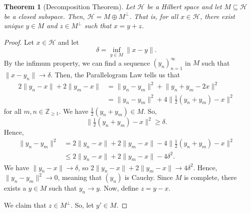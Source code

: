 \documentclass[a4paper, openany]{memoir}
\theoremstyle{definition}
\theoremstyle{plain}
\newtheorem{theorem}[definition]{Theorem}
\begin{document}
    \begin{theorem}[Decomposition Theorem]
        Let $\mathcal{H}$ be a Hilbert space and let $M \subseteq \mathcal{H}$ be a closed subspace. Then, $\mathcal{H} = M \oplus M^\perp$. That is, for all $x \in \mathcal{H}$, there exist unique $y \in M$ and $z \in M^\perp$ such that $x = y + z$.
    \end{theorem}
    \begin{proof}
        Let $x \in \mathcal{H}$ and let
        \[\delta = \inf_{y \in M} \lVert x - y \rVert.\]
        By the infimum property, we can find a sequence $(y_n)_{n=1}^\infty$ in $M$ such that $\lVert x - y_n \rVert \to \delta$. Then, the Parallelogram Law tells us that 
        \begin{align*}
            2\lVert y_n - x \rVert + 2\lVert y_m - x \rVert &= \lVert y_n - y_m \rVert^2 + \lVert y_n + y_m - 2x \rVert^2 \\
            &= \lVert y_n - y_m \rVert^2 + 4 \lVert \tfrac{1}{2} (y_n + y_m) - x \rVert^2
        \end{align*}
        for all $m, n \in \mathbb{Z}_{\geq 1}$. We have $\frac{1}{2}(y_n + y_m) \in M$. So,
        \[\lVert \tfrac{1}{2} (y_n + y_m) - x \rVert^2 \geq \delta.\]
        Hence,
        \begin{align*}
            \lVert y_n - y_m \rVert^2 &= 2\lVert y_n - x \rVert + 2\lVert y_m - x \rVert -  4\lVert \tfrac{1}{2} (y_n + y_m) - x \rVert^2 \\
            &\leq 2\lVert y_n - x \rVert + 2\lVert y_m - x \rVert - 4\delta^2.
        \end{align*}
        We have $\lVert y_n - x \rVert \to \delta$, so $2\lVert y_n - x \rVert + 2\lVert y_m - x \rVert \to 4\delta^2$. Hence, $\lVert y_n - y_m \rVert^2 \to 0$, meaning that $(y_n)$ is Cauchy. Since $M$ is complete, there exists a $y \in M$ such that $y_n \to y$. Now, define $z = y - x$. 
        
        We claim that $z \in M^\perp$. So, let $y' \in M$.
    \end{proof}
\end{document}
